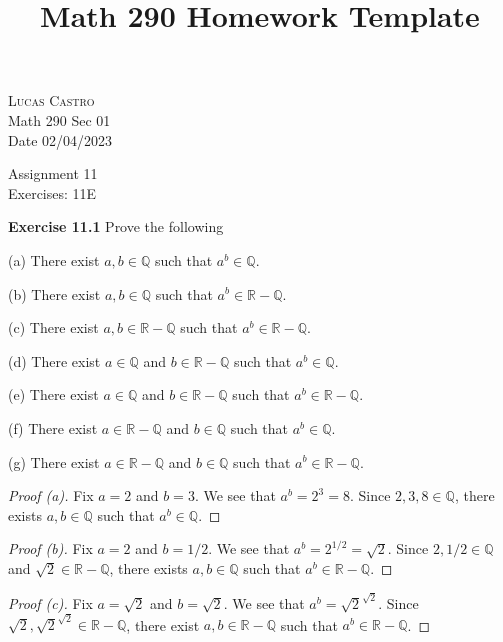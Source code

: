 \documentclass[12pt,oneside]{article}
\newenvironment{exercise}[1]{\vspace{.1in}\noindent\textbf{Exercise #1 \hspace{.05em}}}{}
\newcommand{\R}{\mathbb{R}}
\newcommand{\Q}{\mathbb{Q}}
\begin{document}
\title{Math 290 Homework Template}

\begin{flushright}
\textsc{Lucas Castro}  \\
Math 290 Sec 01\\
Date 02/04/2023
\end{flushright}

\begin{center}
\textsf{Assignment 11} \\
\textsf{Exercises: 11E}
\end{center}


\begin{exercise}{11.1}
Prove the following

(a) There exist $a,b \in \Q$ such that $a^b \in \Q$.

(b) There exist $a,b \in \Q$ such that $a^b \in \R - \Q$.

(c) There exist $a,b \in \R - \Q$ such that $a^b \in \R - \Q$.

(d) There exist $a \in \Q$ and $b \in \R - \Q$ such that $a^b \in \Q$.

(e) There exist $a \in \Q$ and $b \in \R - \Q$ such that $a^b \in \R - \Q$.

(f) There exist $a \in \R - \Q$ and $b \in \Q$ such that $a^b \in \Q$.

(g) There exist $a \in \R - \Q$ and $b \in \Q$ such that $a^b \in \R - \Q$.
\end{exercise}

\begin{proof}[Proof (a)]
Fix $a = 2$ and $b = 3$. We see that $a^b = 2^3 = 8$. Since $2,3,8 \in \Q$, there exists $a,b \in \Q$ such that $a^b \in \Q$.
\end{proof}

\begin{proof}[Proof (b)]
Fix $a = 2$ and $b = 1/2$. We see that $a^b = 2^{1/2} = \sqrt{2}$. Since $2,1/2 \in \Q$ and $\sqrt{2} \in \R - \Q$, there exists $a,b \in \Q$ such that $a^b \in \R - \Q$.
\end{proof}

\begin{proof}[Proof (c)]
Fix $a = \sqrt{2}$ and $b = \sqrt{2}$. We see that $a^b = \sqrt{2}^{\sqrt{2}}$. Since $\sqrt{2}, \sqrt{2}^{\sqrt{2}} \in \R - \Q$, there exist $a,b \in \R - \Q$ such that $a^b \in \R - \Q$. 
\end{proof}
\end{document}
